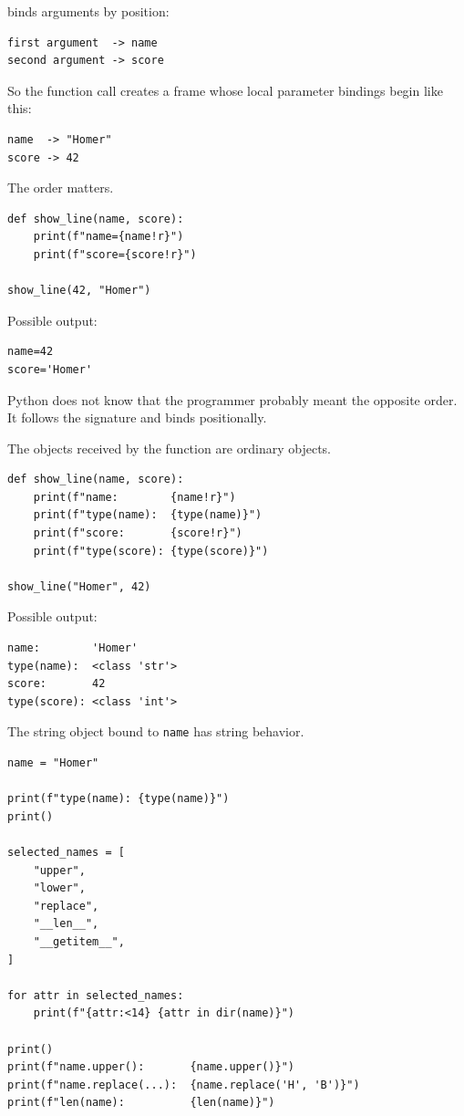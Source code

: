 binds arguments by position:

\begin{verbatim}
first argument  -> name
second argument -> score
\end{verbatim}

So the function call creates a frame whose local parameter bindings begin like this:

\begin{verbatim}
name  -> "Homer"
score -> 42
\end{verbatim}

The order matters.

\begin{verbatim}
def show_line(name, score):
    print(f"name={name!r}")
    print(f"score={score!r}")

show_line(42, "Homer")
\end{verbatim}

Possible output:

\begin{verbatim}
name=42
score='Homer'
\end{verbatim}

Python does not know that the programmer probably meant the opposite order. It follows the signature and binds positionally.

The objects received by the function are ordinary objects.

\begin{verbatim}
def show_line(name, score):
    print(f"name:        {name!r}")
    print(f"type(name):  {type(name)}")
    print(f"score:       {score!r}")
    print(f"type(score): {type(score)}")

show_line("Homer", 42)
\end{verbatim}

Possible output:

\begin{verbatim}
name:        'Homer'
type(name):  <class 'str'>
score:       42
type(score): <class 'int'>
\end{verbatim}

The string object bound to \texttt{name} has string behavior.

\begin{verbatim}
name = "Homer"

print(f"type(name): {type(name)}")
print()

selected_names = [
    "upper",
    "lower",
    "replace",
    "__len__",
    "__getitem__",
]

for attr in selected_names:
    print(f"{attr:<14} {attr in dir(name)}")

print()
print(f"name.upper():       {name.upper()}")
print(f"name.replace(...):  {name.replace('H', 'B')}")
print(f"len(name):          {len(name)}")
\end{verbatim}

